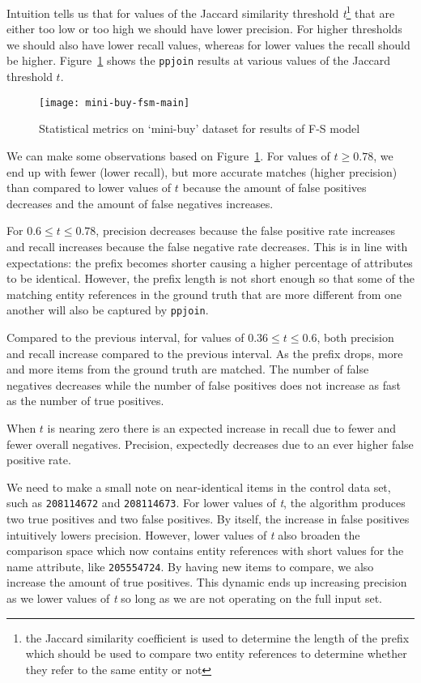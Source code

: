 Intuition tells us that for values of the Jaccard similarity threshold
\textit{t}\footnote[1]{the Jaccard similarity coefficient is used to determine
    the length of the prefix which should be used to compare two entity references
    to determine whether they refer to the same entity or not} that are either too
low or too high we should have lower precision.
For higher thresholds we should also have lower recall values, whereas for
lower values the recall should be higher.
Figure~\ref{fig:mini-buy-fs} shows the \texttt{ppjoin} results at various
values of the Jaccard threshold $t$.

\begin{figure}[htbp]
    \centering
    \captionsetup{justification=centering}
    \texttt{[image: mini-buy-fsm-main]}
    \caption{Statistical metrics on `mini-buy' dataset for results of F-S model}\label{fig:mini-buy-fs}
\end{figure}

We can make some observations based on Figure~\ref{fig:mini-buy-fs}.
For values of $t \geq 0.78$, we end up with fewer (lower recall), but more
accurate matches (higher precision) than compared to lower values of $t$ because
the amount of false positives decreases and the amount of false negatives
increases.

For $0.6 \leq t \le 0.78$, precision decreases because the false
positive rate increases and recall increases because the false negative rate
decreases.
This is in line with expectations: the prefix becomes shorter causing a higher
percentage of attributes to be identical.
However, the prefix length is not short enough so that some of the matching
entity references in the ground truth that are more different from one another
will also be captured by \texttt{ppjoin}.

Compared to the previous interval, for values of $0.36 \leq t \le 0.6$, both
precision and recall increase compared to the previous interval.
As the prefix drops, more and more items from the ground truth are matched.
The number of false negatives decreases while the number of false positives
does not increase as fast as the number of true positives.

When $t$ is nearing zero there is an expected increase in recall due to fewer
and fewer overall negatives.
Precision, expectedly decreases due to an ever higher false positive rate.

We need to make a small note on near-identical items in the control data set,
such as \texttt{208114672} and \texttt{208114673}.
For lower values of \textit{t}, the algorithm produces two true positives and
two false positives.
By itself, the increase in false positives intuitively lowers precision.
However, lower values of \textit{t} also broaden the comparison space which
now contains entity references with short values for the name attribute,
like \texttt{205554724}.
By having new items to compare, we also increase the amount of true positives.
This dynamic ends up increasing precision as we lower values of \textit{t} so
long as we are not operating on the full input set.

